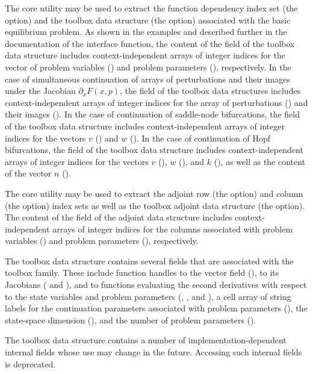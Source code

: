 The  core utility may be used to extract the function dependency index set (the  option) and the toolbox data structure (the  option) associated with the basic equilibrium problem. As shown in the examples and described further in the documentation of the  interface function, the content of the  field of the toolbox data structure includes context-independent arrays of integer indices for the vector of problem variables () and problem parameters (), respectively. In the case of simultaneous continuation of arrays of perturbations and their images under the Jacobian $\partial_x F(x,p)$, the  field of the toolbox data structures includes context-independent arrays of integer indices for the array of perturbations () and their images (). In the case of continuation of saddle-node bifurcations, the  field of the toolbox data structure includes context-independent arrays of integer indices for the vectors $v$ () and $w$ (). In the case of continuation of Hopf bifurcations, the  field of the toolbox data structure includes context-independent arrays of integer indices for the vectors $v$ (), $w$ (), and $k$ (), as well as the content of the vector $n$ ().

The  core utility may be used to extract the adjoint row (the  option) and column (the  option) index sets as well as the toolbox adjoint data structure (the  option). The content of the  field of the adjoint data structure includes context-independent arrays of integer indices for the columns associated with problem variables () and problem parameters (), respectively. 

The  toolbox data structure contains several fields that are associated with the  toolbox family. These include function handles to the vector field (), to its Jacobians ( and ), and to functions evaluating the second derivatives with respect to the state variables and problem parameters (, , and ), a cell array of string labels for the continuation parameters associated with problem parameters (), the state-space dimension (), and the number of problem parameters ().

The  toolbox data structure contains a number of implementation-dependent internal fields whose use may change in the future. Accessing such internal fields is deprecated.

